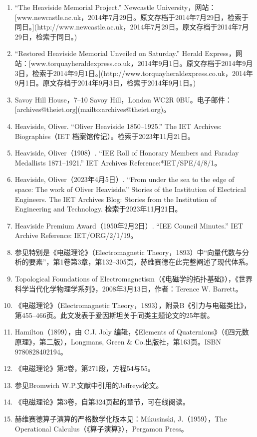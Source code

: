 \begin{enumerate}
\item “The Heaviside Memorial Project.” Newcastle University，网站：[www.newcastle.ac.uk，2014年7月29日。原文存档于2014年7月29日，检索于同日。](http://www.newcastle.ac.uk，2014年7月29日。原文存档于2014年7月29日，检索于同日。)
\item “Restored Heaviside Memorial Unveiled on Saturday.” Herald Express，网站：[www.torquayheraldexpress.co.uk，2014年9月1日。原文存档于2014年9月3日，检索于2014年9月1日。](http://www.torquayheraldexpress.co.uk，2014年9月1日。原文存档于2014年9月3日，检索于2014年9月1日。)
\item Savoy Hill House，7–10 Savoy Hill，London WC2R 0BU。电子邮件：[archives@theiet.org](mailto:archives@theiet.org)。
\item Heaviside, Oliver. “Oliver Heaviside 1850–1925.” The IET Archives: Biographies（IET 档案馆传记）。检索于2023年11月21日。
\item Heaviside, Oliver（1908）. “IEE Roll of Honorary Members and Faraday Medallists 1871–1921.” IET Archives Reference:*IET/SPE/4/8/1。
\item Heaviside, Oliver（2023年4月5日）. “From under the sea to the edge of space: The work of Oliver Heaviside.” Stories of the Institution of Electrical Engineers. The IET Archives Blog: Stories from the Institution of Engineering and Technology. 检索于2023年11月21日。
\item Heaviside Premium Award（1950年2月2日）. “IEE Council Minutes.” IET Archive Reference: IET/ORG/2/1/19。
\item 参见特别是《电磁理论》（Electromagnetic Theory，1893）中“向量代数与分析的要素”，第1卷第3章，第132–305页，赫维赛德在此完整阐述了现代体系。
\item Topological Foundations of Electromagnetism（《电磁学的拓扑基础》），《世界科学当代化学物理学系列》，2008年3月13日，作者：Terence W. Barrett。
\item 《电磁理论》（Electromagnetic Theory，1893），附录B《引力与电磁类比》，第455–466页。此文发表于爱因斯坦关于同类主题论文的25年前。
\item Hamilton（1899），由 C.J. Joly 编辑，《Elements of Quaternions》（《四元数原理》，第二版），Longmans, Green & Co.出版社，第163页。ISBN 9780828402194。
\item 《电磁理论》第2卷，第271段，方程54与55。
\item 参见Bromwich W.P.文献中引用的Jeffreys论文。
\item 《电磁理论》第3卷，自第324页起的章节，可在线阅读。
\item 赫维赛德算子演算的严格数学化版本见：Mikusinski, J.（1959），The Operational Calculus（《算子演算》），Pergamon Press。

\end{enumerate}
